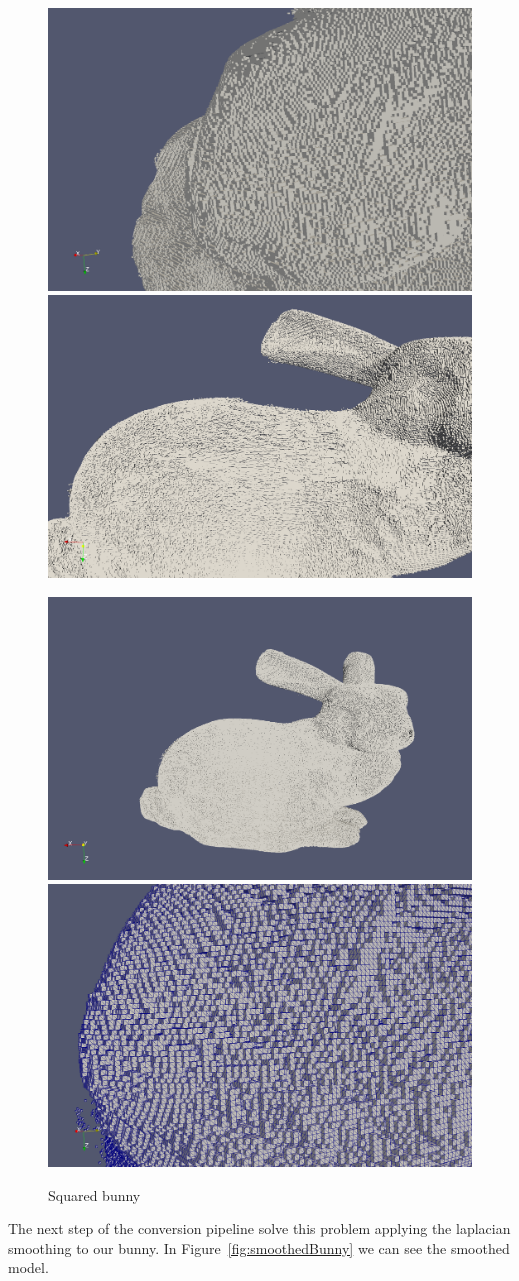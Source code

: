 \begin{figure}[htb] %
   \centering
   \includegraphics[width=0.49\linewidth]{images/nosmooth0.png}\hfill
   \includegraphics[width=0.49\linewidth]{images/nosmooth1.png}\newline
   
   \includegraphics[width=0.49\linewidth]{images/nosmooth3.png}\hfill
   \includegraphics[width=0.49\linewidth]{images/nosmooth4.png}
   \caption[Squared bunny]{Squared bunny}
   \label{fig:squaredBunny}
\end{figure}

The next step of the conversion pipeline solve this problem applying the laplacian smoothing to our bunny. In Figure~\ref{fig:smoothedBunny} we can see the smoothed model.

